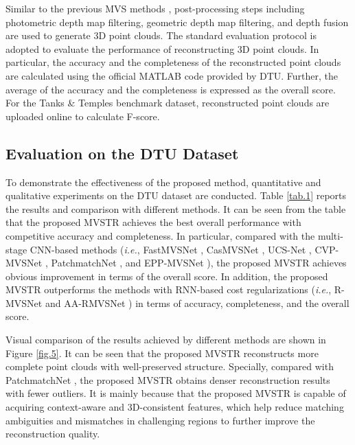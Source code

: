 \documentclass[10pt,twocolumn,letterpaper]{article}
\begin{document}
Similar to the previous MVS methods \cite{mvsnet, casmvsnet, patchmatchnet}, post-processing steps including photometric depth map filtering, geometric depth map filtering, and depth fusion are used to generate 3D point clouds. The standard evaluation protocol \cite{dtu} is adopted to evaluate the performance of reconstructing 3D point clouds. In particular, the accuracy and the completeness of the reconstructed point clouds are calculated using the official MATLAB code provided by DTU. Further, the average of the accuracy and the completeness is expressed as the overall score. For the Tanks \& Temples benchmark dataset, reconstructed point clouds are uploaded online to calculate F-score. 

\subsection{Evaluation on the DTU Dataset}

To demonstrate the effectiveness of the proposed method, quantitative and qualitative experiments on the DTU dataset are conducted. Table \ref{tab.1} reports the results and comparison with different methods. It can be seen from the table that the proposed MVSTR achieves the best overall performance with competitive accuracy and completeness. In particular, compared with the multi-stage CNN-based methods (\textit{i.e.}, FastMVSNet \cite{fastmvsnet}, CasMVSNet \cite{casmvsnet}, UCS-Net \cite{ucsnet}, CVP-MVSNet \cite{cvpmvsnet}, PatchmatchNet \cite{patchmatchnet}, and EPP-MVSNet \cite{eppmvsnet}), the proposed MVSTR achieves obvious improvement in terms of the overall score. In addition, the proposed MVSTR outperforms the methods with RNN-based cost regularizations (\textit{i.e.}, R-MVSNet \cite{rmvsnet} and AA-RMVSNet \cite{aarmvsnet}) in terms of accuracy, completeness, and the overall score.

Visual comparison of the results achieved by different methods are shown in Figure \ref{fig.5}. It can be seen that the proposed MVSTR reconstructs more complete point clouds with well-preserved structure. Specially, compared with PatchmatchNet \cite{patchmatchnet}, the proposed MVSTR obtains denser reconstruction results with fewer outliers. It is mainly because that the proposed MVSTR is capable of acquiring context-aware and 3D-consistent features, which help reduce matching ambiguities and mismatches in challenging regions to further improve the reconstruction quality.
\end{document}

